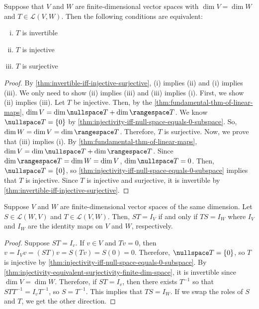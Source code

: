\documentclass{article}
\begin{document}
\begin{theorem}[injectivity is equivalent to surjectivity if $\dim V =
  \dim W < \infty$]
  \label{thm:injectivity-equivalent-surjectivity-finite-dim-space}
  Suppose that $V$ and $W$ are finite-dimensional vector spaces with
  $\dim V = \dim W$ and $T \in \mathcal{L}(V, W)$. Then the following
  conditions are equivalent:
  \begin{enumerate}[(i)]
  \item $T$ is invertible
  \item $T$ is injective
  \item $T$ is surjective
  \end{enumerate}
\end{theorem}
\begin{proof}
  By \cref{thm:invertible-iff-injective-surjective}, (i) implies (ii)
  and (i) implies (iii). We only need to show (ii) implies (iii) and
  (iii) implies (i). First, we show (ii) implies (iii). Let $T$ be
  injective. Then, by the \cref{thm:fundamental-thm-of-linear-maps},
  $\dim V = \dim \nullspace T + \dim \rangespace T$. We know $\nullspace
  T = \{0\}$ by
  \cref{thm:injectivity-iff-null-space-equals-0-subspace}. So, $\dim W
  = \dim V = \dim \rangespace T$. Therefore, $T$ is surjective. Now,
  we prove that (iii) implies (i). By
  \cref{thm:fundamental-thm-of-linear-maps}, $\dim V = \dim \nullspace
  T + \dim \rangespace T$. Since $\dim \rangespace T = \dim W = \dim
  V$, $\dim \nullspace T = 0$. Then, $\nullspace T = \{0\}$, so
  \cref{thm:injectivity-iff-null-space-equals-0-subspace} implies that
  $T$ is injective. Since $T$ is injective and surjective, it is
  invertible by \cref{thm:invertible-iff-injective-surjective}.
\end{proof}

\begin{theorem}[$ST = I \iff TS = I$ on vector spaces of the same
  dimension]
  Suppose $V$ and $W$ are finite-dimensional vector spaces of the same
  dimension. Let $S \in \mathcal{L}(W, V)$ and $T \in \mathcal{L}(V,
  W)$. Then, $ST = I_V$ if and only if $TS = I_W$ where $I_V$ and
  $I_W$ are the identity maps on $V$ and $W$, respectively.
\end{theorem}
\begin{proof}
  Suppose $ST = I_v$. If $v \in V$ and $Tv = 0$, then $v = I_Vv =
  (ST)v = S(Tv) = S(0) = 0$. Therefore, $\nullspace T = \{0\}$, so $T$
  is injective by
  \cref{thm:injectivity-iff-null-space-equals-0-subspace}. By
  \cref{thm:injectivity-equivalent-surjectivity-finite-dim-space}, it
  is invertible since $\dim V = \dim W$. Therefore, if $ST = I_v$,
  then there exists $T^{-1}$ so that $STT^{-1} = I_vT^{-1}$, so $S =
  T^{-1}$. This implies that $TS = I_W$. If we swap the roles of $S$
  and $T$, we get the other direction.
\end{proof}
\end{document}
